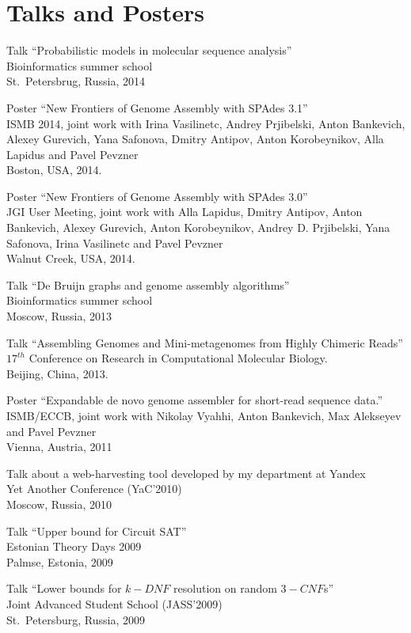 \section{Talks and Posters}
\begin{innerlist}
 \item Talk ``Probabilistic models in molecular sequence analysis''\\
       Bioinformatics summer school\\
       St.~Petersbrug, Russia, 2014
 \item Poster ``New Frontiers of Genome Assembly with SPAdes 3.1''\\  
       ISMB 2014, joint work with Irina Vasilinetc, Andrey Prjibelski, Anton Bankevich, Alexey Gurevich, Yana Safonova, Dmitry Antipov, Anton Korobeynikov, Alla Lapidus and Pavel Pevzner\\
       Boston, USA, 2014. 
 \item Poster ``New Frontiers of Genome Assembly with SPAdes 3.0''\\
       JGI User Meeting, joint work with Alla Lapidus, Dmitry Antipov, Anton Bankevich, Alexey Gurevich, Anton Korobeynikov, Andrey D. Prjibelski, Yana Safonova, Irina Vasilinetc and Pavel Pevzner \\ 
       Walnut Creek, USA, 2014.
 \item Talk ``De Bruijn graphs and genome assembly algorithms''\\
       Bioinformatics summer school\\
       Moscow, Russia, 2013
 \item Talk ``Assembling Genomes and Mini-metagenomes from Highly Chimeric Reads''
       $17^{th}$ Conference on Research in Computational Molecular Biology.\\ 
       Beijing, China, 2013.
 \item Poster ``Expandable de novo genome assembler for short-read sequence data.''\\
       ISMB/ECCB, joint work with Nikolay Vyahhi, Anton Bankevich, Max Alekseyev and Pavel Pevzner\\ 
       Vienna, Austria, 2011
 \item Talk about a web-harvesting tool developed by my department at Yandex\\
       Yet Another Conference (YaC'2010)\\
       Moscow, Russia, 2010
 \item Talk ``Upper bound for Circuit SAT''\\
       Estonian Theory Days 2009\\
       Palmse, Estonia, 2009
 \item Talk ``Lower bounds for $k-DNF$ resolution on random $3-CNF$s''\\
       Joint Advanced Student School (JASS'2009)\\
       St.~Petersburg, Russia, 2009
\end{innerlist}
